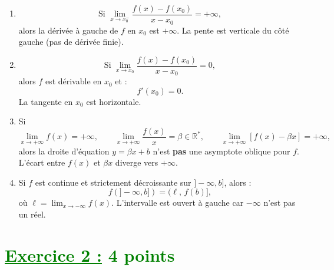 \documentclass[12pt,a4paper]{article}
\begin{document}
\begin{enumerate}
\item \[
\text{Si } \lim_{x \to x_0^-} \frac{f(x)-f(x_0)}{x-x_0} = +\infty,
\]
alors la dérivée à gauche de \(f\) en \(x_0\) est \(+\infty\).  
La pente est verticale du côté gauche (pas de dérivée finie).

\item \[
\text{Si } \lim_{x \to x_0} \frac{f(x)-f(x_0)}{x-x_0} = 0,
\]
alors \(f\) est dérivable en \(x_0\) et :
\[
f'(x_0) = 0.
\]
La tangente en \(x_0\) est horizontale.

\item Si
\[
\lim_{x \to +\infty} f(x) = +\infty, \qquad 
\lim_{x \to +\infty} \frac{f(x)}{x} = \beta \in \mathbb{R}^*, \qquad
\lim_{x \to +\infty} [f(x) - \beta x] = +\infty,
\]
alors la droite d’équation \(y = \beta x + b\) n’est \textbf{pas} une asymptote oblique pour \(f\).  
L'écart entre \(f(x)\) et \(\beta x\) diverge vers \(+\infty\).

\item Si \(f\) est continue et strictement décroissante sur \(]-\infty, b]\), alors :
\[
f(]-\infty, b]) = (\ell,\, f(b)],
\]
où \(\displaystyle \ell = \lim_{x \to -\infty} f(x)\).
L’intervalle est ouvert à gauche car \(-\infty\) n’est pas un réel.
\end{enumerate}


\section*{\textcolor{green}{\underline{Exercice 2 :} 4 points}}
\end{document}
